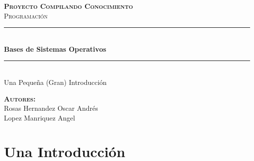 \documentclass[12pt, fleqn]{report}                             %
\author{Oscar Andrés Rosas}                                     %
\begin{document}
\begin{titlepage}

	\center
	\textbf{\textsc{\Large Proyecto Compilando Conocimiento}}\\[1.0cm] 
	\textsc{\Large Programación}\\[1.0cm] 

	\rule{\linewidth}{0.5mm} \\[1.0cm]
		{ \huge \bfseries Bases de Sistemas Operativos}\\[1.0cm] 
	\rule{\linewidth}{0.5mm} \\[2.0cm]
	
	{\LARGE Una Pequeña (Gran) Introducción}\\[7cm] 
	
	\begin{center} \large
    \textbf{\textsc{Autores:}}\\
        Rosas Hernandez Oscar Andrés \\
        Lopez Manriquez Angel
    \end{center}

	\vfill

\end{titlepage}

\tableofcontents{}
\label{sec:Index}

\clearpage




\part{Una Introducción}
\clearpage


\end{document}
